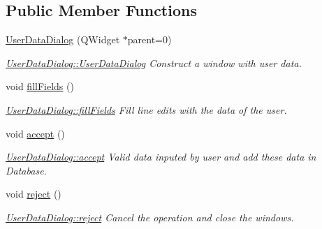 \subsection*{Public Member Functions}
\begin{DoxyCompactItemize}
\item 
\hyperlink{classGui_1_1Dialogs_1_1UserDataDialog_a3cafa419d49d124e72511a3b91f8ee76}{User\-Data\-Dialog} (Q\-Widget $\ast$parent=0)
\begin{DoxyCompactList}\small\item\em \hyperlink{classGui_1_1Dialogs_1_1UserDataDialog_a3cafa419d49d124e72511a3b91f8ee76}{User\-Data\-Dialog\-::\-User\-Data\-Dialog} Construct a window with user data. \end{DoxyCompactList}\item 
\hypertarget{classGui_1_1Dialogs_1_1UserDataDialog_ae1a17e6547a30b03ba2c837ba0b28455}{void \hyperlink{classGui_1_1Dialogs_1_1UserDataDialog_ae1a17e6547a30b03ba2c837ba0b28455}{fill\-Fields} ()}\label{classGui_1_1Dialogs_1_1UserDataDialog_ae1a17e6547a30b03ba2c837ba0b28455}

\begin{DoxyCompactList}\small\item\em \hyperlink{classGui_1_1Dialogs_1_1UserDataDialog_ae1a17e6547a30b03ba2c837ba0b28455}{User\-Data\-Dialog\-::fill\-Fields} Fill line edits with the data of the user. \end{DoxyCompactList}\item 
\hypertarget{classGui_1_1Dialogs_1_1UserDataDialog_a2d3841c471d0ddfd58610d3667d8521a}{void \hyperlink{classGui_1_1Dialogs_1_1UserDataDialog_a2d3841c471d0ddfd58610d3667d8521a}{accept} ()}\label{classGui_1_1Dialogs_1_1UserDataDialog_a2d3841c471d0ddfd58610d3667d8521a}

\begin{DoxyCompactList}\small\item\em \hyperlink{classGui_1_1Dialogs_1_1UserDataDialog_a2d3841c471d0ddfd58610d3667d8521a}{User\-Data\-Dialog\-::accept} Valid data inputed by user and add these data in Database. \end{DoxyCompactList}\item 
\hypertarget{classGui_1_1Dialogs_1_1UserDataDialog_a919f59546670019bb4e72fcd0c7ea841}{void \hyperlink{classGui_1_1Dialogs_1_1UserDataDialog_a919f59546670019bb4e72fcd0c7ea841}{reject} ()}\label{classGui_1_1Dialogs_1_1UserDataDialog_a919f59546670019bb4e72fcd0c7ea841}

\begin{DoxyCompactList}\small\item\em \hyperlink{classGui_1_1Dialogs_1_1UserDataDialog_a919f59546670019bb4e72fcd0c7ea841}{User\-Data\-Dialog\-::reject} Cancel the operation and close the windows. \end{DoxyCompactList}\end{DoxyCompactItemize}


